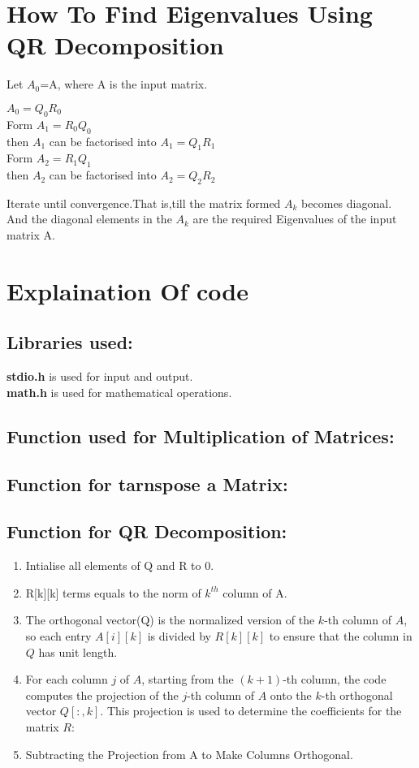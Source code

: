 \documentclass[12pt]{article}
\begin{document}
\section{How To Find Eigenvalues Using QR Decomposition}
Let $A_0$=A, where A is the input matrix.\\
\begin{center}
    $A_0=Q_0R_0$ \\
   Form $A_1=R_0Q_0$ \\
   then $A_1$ can be factorised into $A_1=Q_1R_1$\\
   Form $A_2=R_1Q_1$ \\
   then $A_2$ can be factorised into $A_2=Q_2R_2$ \\
\end{center}
   Iterate until convergence.That is,till the matrix formed $A_k$ becomes diagonal. \\
   And the diagonal elements in the $A_k$ are the required Eigenvalues of the input matrix A.

\section{\textbf{Explaination Of code}}
\subsection{Libraries used: }

\textbf{stdio.h} is used for input and output. \\
\textbf{math.h} is used for mathematical operations.
\subsection{Function used for Multiplication of Matrices: }

\subsection{Function for tarnspose a Matrix: }

\subsection{Function for QR Decomposition: }

\begin{enumerate}
    \item Intialise all elements of Q and R to 0.
    \item R[k][k] terms equals to the norm of $k^{th}$ column of A.
    \item The orthogonal vector(Q) is the normalized version of the \( k \)-th column of \( A \), so each entry \( A[i][k] \) is divided by \( R[k][k] \) to ensure that the column in \( Q \) has unit length.
\item For each column \( j \) of \( A \), starting from the \( (k+1) \)-th column, the code computes the projection of the \( j \)-th column of \( A \) onto the \( k \)-th orthogonal vector \( Q[:, k] \). This projection is used to determine the coefficients for the matrix \( R \):
\item Subtracting the Projection from A to Make Columns Orthogonal.
\end{enumerate}
\end{document}
